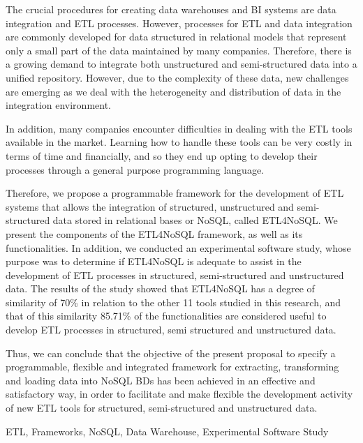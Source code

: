 The crucial procedures for creating data warehouses and BI systems are data integration and ETL processes. However, processes for ETL and data integration are commonly developed for data structured in relational models that represent only a small part of the data maintained by many companies. Therefore, there is a growing demand to integrate both unstructured and semi-structured data into a unified repository. However, due to the complexity of these data, new challenges are emerging as we deal with the heterogeneity and distribution of data in the integration environment.

In addition, many companies encounter difficulties in dealing with the ETL tools available in the market. Learning how to handle these tools can be very costly in terms of time and financially, and so they end up opting to develop their processes through a general purpose programming language.

Therefore, we propose a programmable framework for the development of ETL systems that allows the integration of structured, unstructured and semi-structured data stored in relational bases or NoSQL, called ETL4NoSQL. We present the components of the ETL4NoSQL framework, as well as its functionalities. In addition, we conducted an experimental software study, whose purpose was to determine if ETL4NoSQL is adequate to assist in the development of ETL processes in structured, semi-structured and unstructured data. The results of the study showed that ETL4NoSQL has a degree of similarity of 70\% in relation to the other 11 tools studied in this research, and that of this similarity 85.71\% of the functionalities are considered useful to develop ETL processes in structured, semi structured and unstructured data.

Thus, we can conclude that the objective of the present proposal to specify a programmable, flexible and integrated framework for extracting, transforming and loading data into NoSQL BDs has been achieved in an effective and satisfactory way, in order to facilitate and make flexible the development activity of new ETL tools for structured, semi-structured and unstructured data.


\begin{keywords}
	ETL, Frameworks, NoSQL, Data Warehouse, Experimental Software Study
\end{keywords}
